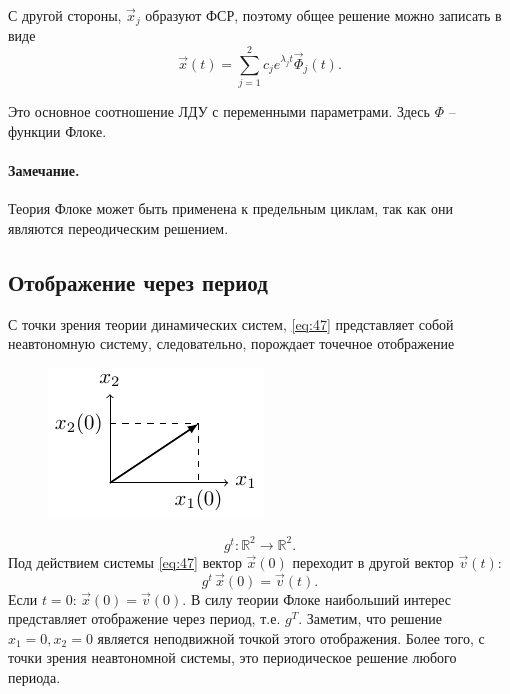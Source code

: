 С другой стороны, $\vec{x}_j$ образуют ФСР, поэтому общее решение можно записать в виде
\begin{equation}
	\vec{x}(t)=\sum_{j=1}^2 c_j e^{\lambda_j t}\vec{\Phi}_j(t).
	\label{eq:65}
\end{equation}

Это основное соотношение ЛДУ с переменными параметрами. Здесь $\Phi$ -- функции Флоке. 

\paragraph{Замечание. } Теория Флоке может быть применена к предельным циклам, так как  они являются переодическим решением. 




\subsection{Отображение через период}

С точки зрения теории динамических систем, \eqref{eq:47} представляет собой неавтономную систему, следовательно, порождает точечное отображение 

\begin{figure}
	\centering
    \vspace{-1ex}%
    \includegraphics[scale=1.5]{img/parametric_oscillations/x_to_v}
    \label{img02}
\end{figure}
$$g^t:\mathds{R}^2\rightarrow \mathds{R}^2.$$
Под действием системы \eqref{eq:47} вектор $\vec{x}(0)$ переходит в другой вектор $\vec{v}(t)$:
\begin{equation*}
	g^t\,\vec{x}(0)=\vec{v}(t).
\end{equation*}
Если $t=0: \,\vec{x}(0)=\vec{v}(0)$.
В силу теории Флоке наибольший интерес представляет отображение через период, т.е. $g^T$. Заметим, что решение $x_1=0, x_2=0$ является неподвижной точкой этого отображения. Более того, с точки зрения неавтономной системы, это периодическое решение любого периода. 

